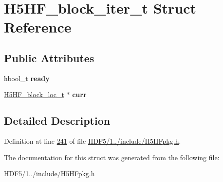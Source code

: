 \hypertarget{struct_h5_h_f__block__iter__t}{}\section{H5\+H\+F\+\_\+block\+\_\+iter\+\_\+t Struct Reference}
\label{struct_h5_h_f__block__iter__t}
\subsection*{Public Attributes}
\begin{DoxyCompactItemize}
\item 
\mbox{\label{struct_h5_h_f__block__iter__t_a105d4c492cc36714823969989340ce2b}} 
hbool\+\_\+t {\bfseries ready}
\item 
\mbox{\label{struct_h5_h_f__block__iter__t_a8be72c47109688b93c9960fc5756cca2}} 
\hyperlink{struct_h5_h_f__block__loc__t}{H5\+H\+F\+\_\+block\+\_\+loc\+\_\+t} $\ast$ {\bfseries curr}
\end{DoxyCompactItemize}


\subsection{Detailed Description}


Definition at line \hyperlink{_h_d_f5_21_810_81_2include_2_h5_h_fpkg_8h_source_l00241}{241} of file \hyperlink{_h_d_f5_21_810_81_2include_2_h5_h_fpkg_8h_source}{H\+D\+F5/1../include/\+H5\+H\+Fpkg.\+h}.



The documentation for this struct was generated from the following file\+:\begin{DoxyCompactItemize}
\item 
H\+D\+F5/1../include/\+H5\+H\+Fpkg.\+h\end{DoxyCompactItemize}
